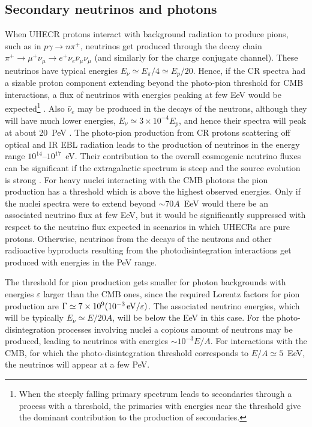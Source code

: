 \documentclass[twoside,12pt]{article}
\begin{document}
\subsection{Secondary neutrinos and photons}
When UHECR protons interact with background radiation to produce pions, such as in $p\gamma\to n\pi^+$,  neutrinos get produced through the decay chain $\pi^+\to\mu^+ \nu_\mu\to e^+\nu_e\bar{\nu}_\mu\nu_\mu$ (and similarly for the charge conjugate channel). These neutrinos have typical energies $E_\nu\simeq E_\pi/4\simeq E_p/20$.  Hence, if the CR spectra had a sizable proton component extending beyond the photo-pion threshold for CMB interactions, a flux of neutrinos with energies peaking at few EeV would be  expected\footnote{ When the steeply falling primary spectrum leads to secondaries through a process with a threshold, the primaries with energies near the threshold give the dominant contribution to the production of secondaries.}  \cite{bz}.  Also ${\bar\nu}_e$ may be produced in the decays of the neutrons, although they will have much lower energies, $E_\nu\simeq 3\times 10^{-4}E_p$, and hence their spectra will peak at about 20~PeV \cite{engelnu}. The photo-pion production from CR protons scattering off optical and IR EBL radiation leads to the production of neutrinos in the energy range $10^{14}$--$10^{17}$~eV. Their contribution to the overall cosmogenic neutrino fluxes can be significant if the extragalactic spectrum is steep and the source evolution is strong \cite{ko10}.
For heavy nuclei interacting with the CMB photons the pion production has a threshold which is above the highest observed energies. Only if the nuclei spectra were to extend beyond $\sim 70A$~EeV would there  be an associated neutrino flux at few EeV, but it would be significantly suppressed with respect to the neutrino flux expected in scenarios in which UHECRs are pure protons. Otherwise, neutrinos from the decays of the neutrons  and other radioactive byproducts resulting from the photodisintegration interactions get produced with energies in the PeV range.

The threshold for pion production  gets smaller for photon backgrounds with energies $\varepsilon$ larger than the CMB ones, since the required Lorentz factors for pion production are $\Gamma\simeq 7\times 10^9(10^{-3}\,{\rm eV}/\varepsilon)$. The associated neutrino energies, which will be typically $E_\nu\simeq E/20A$, will be below the EeV in this case. For the photo-disintegration processes involving nuclei a copious amount of neutrons may be produced, leading to neutrinos with energies $\sim 10^{-3}E/A$. For interactions with the CMB, for which the photo-disintegration threshold corresponds to $E/A\simeq 5$~EeV, the neutrinos will appear at a few PeV. 
\end{document}

